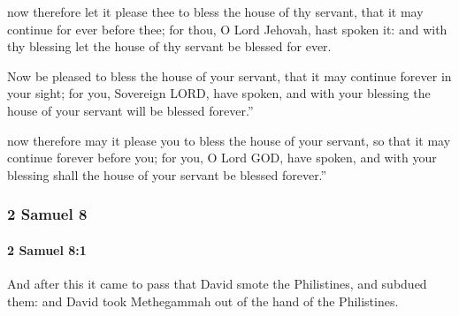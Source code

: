			\begin{versebox}
					\item[BHS] 
					\item[ASV] now therefore let it please thee to bless the house of thy servant, that it may continue for ever before thee; for thou, O Lord Jehovah, hast spoken it: and with thy blessing let the house of thy servant be blessed for ever.
					\item[NIV] Now be pleased to bless the house of your servant, that it may continue forever in your sight; for you, Sovereign LORD, have spoken, and with your blessing the house of your servant will be blessed forever.”
					\item[NRSV] now therefore may it please you to bless the house of your servant, so that it may continue forever before you; for you, O Lord GOD, have spoken, and with your blessing shall the house of your servant be blessed forever.”
			\end{versebox}
	\subsubsection{2 Samuel 8} %
		\label{2SAMUEL-8}

		\paragraph{2 Samuel 8:1} %
			\label{2SAMUEL-8-1}

			And after this it came to pass that David smote the Philistines, and subdued them: and David took Methegammah out of the hand of the Philistines.

